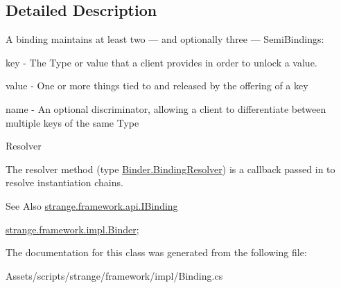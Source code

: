 \subsection{Detailed Description}
A binding maintains at least two — and optionally three — Semi\-Bindings\-: 


\begin{DoxyItemize}
\item key -\/ The Type or value that a client provides in order to unlock a value. 
\item value -\/ One or more things tied to and released by the offering of a key 
\item name -\/ An optional discriminator, allowing a client to differentiate between multiple keys of the same Type 
\end{DoxyItemize}

Resolver

The resolver method (type \hyperlink{classstrange_1_1framework_1_1impl_1_1_binder_aa4e977fc31063ca4d0b029b1abe39dad}{Binder.\-Binding\-Resolver}) is a callback passed in to resolve instantiation chains.

\begin{DoxySeeAlso}{See Also}
\hyperlink{interfacestrange_1_1framework_1_1api_1_1_i_binding}{strange.\-framework.\-api.\-I\-Binding} 

\hyperlink{classstrange_1_1framework_1_1impl_1_1_binder}{strange.\-framework.\-impl.\-Binder}; 
\end{DoxySeeAlso}


The documentation for this class was generated from the following file\-:\begin{DoxyCompactItemize}
\item 
Assets/scripts/strange/framework/impl/Binding.\-cs\end{DoxyCompactItemize}
